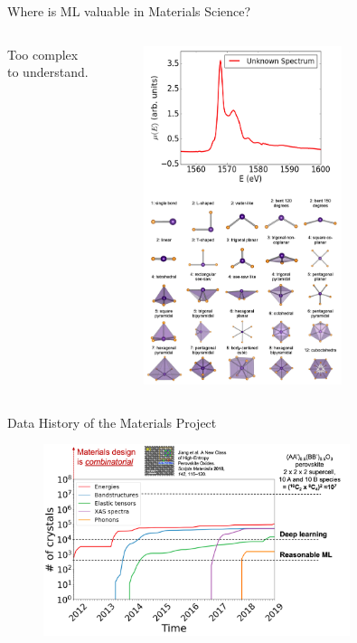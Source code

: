 \documentclass[aspectratio=169]{beamer}
\begin{document}
\begin{frame}[t]{Where is ML valuable in Materials Science?}
\begin{columns}[t]
            Too complex to understand.
            \begin{figure}
                \centering
                \includegraphics[width=0.7\textwidth]{figures/xas_interpretation.png}
            \end{figure}
        \end{columns}
    \end{frame}


    \begin{frame}{Data History of the Materials Project}
        \begin{figure}
            \centering
            \includegraphics[width=0.8\textwidth]{figures/mp_data_hist.png}
        \end{figure}
    \end{frame}
\end{document}
